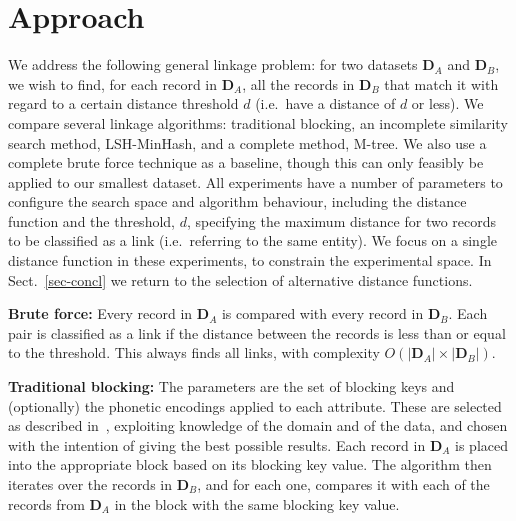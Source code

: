 \documentclass{llncs}
\begin{document}
\section{Approach}
\label{sec-approach}

We address the following general linkage problem: for two
datasets $\mathbf{D}_A$ and $\mathbf{D}_B$, we wish to find, for each
record in $\mathbf{D}_A$, all the records in $\mathbf{D}_B$ that match
it with regard to a certain distance threshold $d$ (i.e.\ have a
distance of $d$ or less). We compare several linkage algorithms: traditional blocking, an incomplete similarity search method,
LSH-MinHash, and a complete method, M-tree. We also use a
complete brute force technique as a baseline, though
this can only feasibly be applied to our smallest dataset. All
experiments have a number of parameters to configure the search space
and algorithm behaviour, including the distance function and the threshold, $d$,
specifying the maximum distance for
two records to be classified as a link (i.e.\ referring to the same
entity).
We focus on a single distance function in these experiments, to constrain the experimental space. In
Sect.~\ref{sec-concl} we return to the selection of alternative distance functions.

\textbf{Brute force:}
Every record in
$\mathbf{D}_A$ is compared with every record in $\mathbf{D}_B$. Each pair is
classified as a link if the distance between the records is less than or equal to
the threshold. This always finds
all links, with complexity $ O(|\mathbf{D}_A| \times |\mathbf{D}_B|)$.

\textbf{Traditional blocking:}
The parameters are the set of blocking keys and
(optionally) the phonetic encodings applied to each attribute. These are
selected as described in~\cite{Chr12b}, exploiting knowledge of the
domain and of the data, and chosen with the intention of
giving the best possible results. Each record in
$\mathbf{D}_A$ is placed into the appropriate block based on its
blocking key value. The algorithm then iterates over the records in
$\mathbf{D}_B$, and for each one, compares it with each of the records
from $\mathbf{D}_A$ in the block with the same blocking key value.
\end{document}
